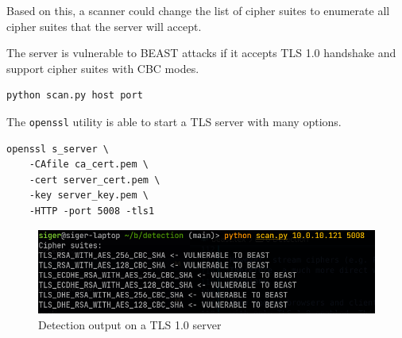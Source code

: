 \documentclass{acm_proc_article-sp}
\begin{document}
Based on this, a scanner could change the list of cipher suites to enumerate all
cipher suites that the server will accept.

The server is vulnerable to BEAST attacks if it accepts TLS 1.0 handshake and support
cipher suites with CBC modes.

\begin{lstlisting}[language=bash]
python scan.py host port
\end{lstlisting}

The \texttt{openssl} utility is able to start a TLS server with many options.

\begin{lstlisting}
openssl s_server \
    -CAfile ca_cert.pem \
    -cert server_cert.pem \
    -key server_key.pem \
    -HTTP -port 5008 -tls1
\end{lstlisting}

\begin{figure}[htb]
    \centering
    \includegraphics[keepaspectratio, width=\linewidth]{./figures/detection-output.png}
    \caption{Detection output on a TLS 1.0 server}
\end{figure}


%
%
\balancecolumns
\appendix
\balancecolumns
\end{document}
